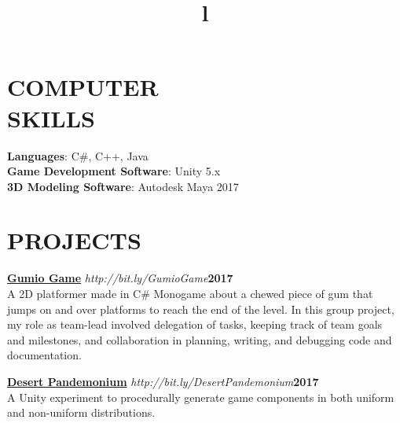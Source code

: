\documentclass[line,margin]{res}
\begin{document}
\begin{resume}
\section{COMPUTER\\SKILLS}
\textbf{Languages}: C\#, C++, Java\\
\textbf{Game Development Software}: Unity 5.x\\
\textbf{3D Modeling Software}: Autodesk Maya 2017
\section{PROJECTS}
\par
    \href{https://github.com/MaeveMonster/GumioGame}{\textbf{Gumio Game}}
    {\sl http://bit.ly/GumioGame}\hfill \textbf{2017}\\ 
    A 2D platformer made in C\# Monogame about a chewed piece of gum that jumps on and over platforms to 
	reach the end of the level. In this group project, my role as team-lead involved delegation of tasks, keeping track of team goals and milestones, and collaboration in planning, writing, and debugging code and documentation.
	
	\par
    \href{https://github.com/MaeveMonster/DesertPandemonium}{\textbf{Desert Pandemonium}}
    {\sl http://bit.ly/DesertPandemonium}\hfill \textbf{2017}\\ 
    A Unity experiment to procedurally generate game components in both uniform and non-uniform distributions.


\begin{format}
\title{l}\\
\\
\body\\
\end{format}

\end{resume}
\end{document}
